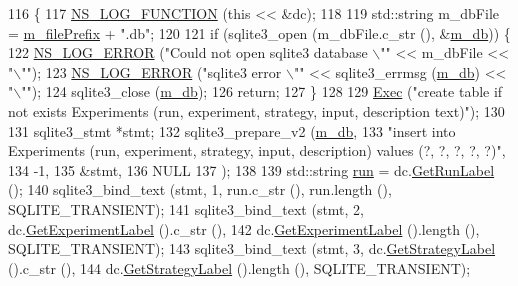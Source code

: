 \begin{DoxyCode}
116 \{
117   \hyperlink{log-macros-disabled_8h_a90b90d5bad1f39cb1b64923ea94c0761}{NS\_LOG\_FUNCTION} (\textcolor{keyword}{this} << &dc);
118 
119   std::string m\_dbFile = \hyperlink{classns3_1_1DataOutputInterface_a7ee2756b63a5586442419d6a214a3341}{m\_filePrefix} + \textcolor{stringliteral}{".db"};
120 
121   \textcolor{keywordflow}{if} (sqlite3\_open (m\_dbFile.c\_str (), &\hyperlink{classns3_1_1SqliteDataOutput_a6d9dcae5a1595e93e79a8ec365e3bbc9}{m\_db})) \{
122       \hyperlink{group__logging_ga0261a8db1d4ac5f79417d117634fd455}{NS\_LOG\_ERROR} (\textcolor{stringliteral}{"Could not open sqlite3 database \(\backslash\)""} << m\_dbFile << \textcolor{stringliteral}{"\(\backslash\)""});
123       \hyperlink{group__logging_ga0261a8db1d4ac5f79417d117634fd455}{NS\_LOG\_ERROR} (\textcolor{stringliteral}{"sqlite3 error \(\backslash\)""} << sqlite3\_errmsg (\hyperlink{classns3_1_1SqliteDataOutput_a6d9dcae5a1595e93e79a8ec365e3bbc9}{m\_db}) << \textcolor{stringliteral}{"\(\backslash\)""});
124       sqlite3\_close (\hyperlink{classns3_1_1SqliteDataOutput_a6d9dcae5a1595e93e79a8ec365e3bbc9}{m\_db});
126       \textcolor{keywordflow}{return};
127     \}
128 
129   \hyperlink{classns3_1_1SqliteDataOutput_a73206b50a726ca299f6347e35bb2dcc1}{Exec} (\textcolor{stringliteral}{"create table if not exists Experiments (run, experiment, strategy, input, description text)"});
130 
131   sqlite3\_stmt *stmt;
132   sqlite3\_prepare\_v2 (\hyperlink{classns3_1_1SqliteDataOutput_a6d9dcae5a1595e93e79a8ec365e3bbc9}{m\_db},
133     \textcolor{stringliteral}{"insert into Experiments (run, experiment, strategy, input, description) values (?, ?, ?, ?, ?)"},
134     -1,
135     &stmt,
136     NULL
137   );
138 
139   std::string \hyperlink{generate__test__data__lte__spectrum__value__txpsd_8m_a093eaf8ac95b223aafb28e4668160d1f}{run} = dc.\hyperlink{classns3_1_1DataCollector_aa3b3c26378c4e1dc0954821a933be305}{GetRunLabel} ();
140   sqlite3\_bind\_text (stmt, 1, run.c\_str (), run.length (), SQLITE\_TRANSIENT);
141   sqlite3\_bind\_text (stmt, 2, dc.\hyperlink{classns3_1_1DataCollector_af62040c154454a67ada1c1b151e1e739}{GetExperimentLabel} ().c\_str (),
142                               dc.\hyperlink{classns3_1_1DataCollector_af62040c154454a67ada1c1b151e1e739}{GetExperimentLabel} ().length (), SQLITE\_TRANSIENT);
143   sqlite3\_bind\_text (stmt, 3, dc.\hyperlink{classns3_1_1DataCollector_a96b68e2cf2f1a1177b280e898fa7d169}{GetStrategyLabel} ().c\_str (),
144                               dc.\hyperlink{classns3_1_1DataCollector_a96b68e2cf2f1a1177b280e898fa7d169}{GetStrategyLabel} ().length (), SQLITE\_TRANSIENT);

\end{DoxyCode}
